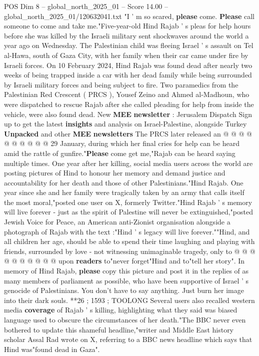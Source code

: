 \begin{textsample}{POS Dim 8 – global\_north\_2025\_01 – Score 14.00 – global\_north\_2025\_01/120632041.txt}  \label{ex:f8_pos_102}
"I ' m so scared, \textbf{please} come. \textbf{Please} call someone to come and take me."Five-year-old Hind Rajab ' s pleas for help hours before she was killed by the Israeli military sent shockwaves around the world a year ago on Wednesday.
The Palestinian child was fleeing Israel ' s assault on Tel al-Hawa, south of Gaza City, with her family when their car came under fire by Israeli forces.
On 10 February 2024, Hind Rajab was found dead after nearly two weeks of being trapped inside a car with her dead family while being surrounded by Israeli military forces and being subject to fire.
Two paramedics from the Palestinian Red Crescent ( PRCS ), Yousef Zeino and Ahmed al-Madhoun, who were dispatched to rescue Rajab after she called pleading for help from inside the vehicle, were also found dead.
New \textbf{MEE} \textbf{newsletter} : Jerusalem Dispatch Sign up to get the latest \textbf{insights} and analysis on Israel-Palestine, alongside Turkey \textbf{Unpacked} and other \textbf{MEE} \textbf{newsletters} The PRCS later released an @ @ @ @ @ @ @ @ @ @ 29 January, during which her final cries for help can be heard amid the rattle of gunfire."\textbf{Please} come get me,"Rajab can be heard saying multiple times.
One year after her killing, social media users across the world are posting pictures of Hind to honour her memory and demand justice and accountability for her death and those of other Palestinians."Hind Rajab.
One year since she and her family were tragically taken by an army that calls itself the most moral,"posted one user on X, formerly Twitter."Hind Rajab ' s memory will live forever - just as the spirit of Palestine will never be extinguished,"posted Jewish Voice for Peace, an American anti-Zionist organisation alongside a photograph of Rajab with the text :"Hind ' s legacy will live forever.""Hind, and all children her age, should be able to spend their time laughing and playing with friends, surrounded by love - not witnessing unimaginable tragedy, only to @ @ @ @ @ @ @ @ @ @ upon \textbf{readers} to"never forget"Hind and to"tell her story".
In memory of Hind Rajab, \textbf{please} copy this picture and post it in the replies of as many members of parliament as possible, who have been supportive of Israel ' s genocide of Palestinians.
You don't have to say anything.
Just burn her image into their dark souls. **26 ; 1593 ; TOOLONG Several users also recalled western media \textbf{coverage} of Rajab ' s killing, highlighting what they said was biased language used to obscure the circumstances of her death."The BBC never even bothered to update this shameful headline,"writer and Middle East history scholar Assal Rad wrote on X, referring to a BBC news headline which says that Hind was"found dead in Gaza".

\end{textsample}
